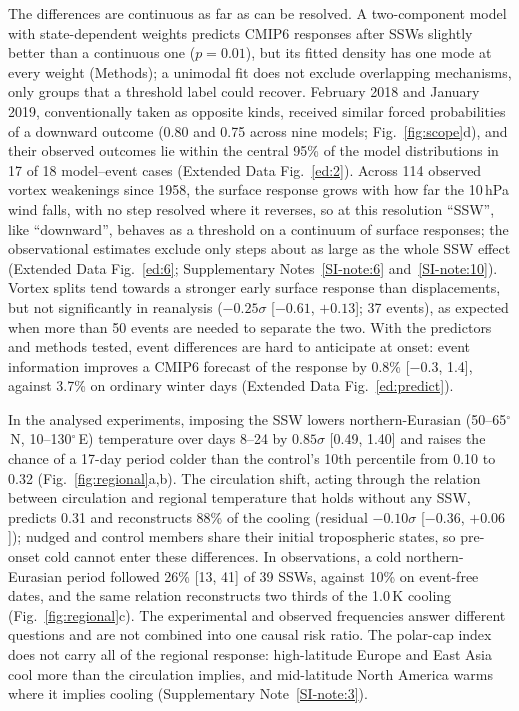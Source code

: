 \documentclass[11pt]{article}
\begin{document}
The differences are continuous as far as can be resolved. A two-component model with state-dependent weights predicts CMIP6 responses after SSWs slightly better than a continuous one ($p = 0.01$), but its fitted density has one mode at every weight (Methods); a unimodal fit does not exclude overlapping mechanisms, only groups that a threshold label could recover. February 2018 and January 2019, conventionally taken as opposite kinds, received similar forced probabilities of a downward outcome (0.80 and 0.75 across nine models; Fig.~\ref{fig:scope}d), and their observed outcomes lie within the central 95\% of the model distributions in 17 of 18 model--event cases (Extended Data Fig.~\ref{ed:2}). Across 114 observed vortex weakenings since 1958, the surface response grows with how far the 10\,hPa wind falls, with no step resolved where it reverses, so at this resolution ``SSW'', like ``downward'', behaves as a threshold on a continuum of surface responses; the observational estimates exclude only steps about as large as the whole SSW effect (Extended Data Fig.~\ref{ed:6}; Supplementary Notes~\ref{SI-note:6} and~\ref{SI-note:10}). Vortex splits tend towards a stronger early surface response than displacements\cite{lehtonen16,nebel24}, but not significantly in reanalysis ($-0.25\sigma$ [$-0.61$, $+0.13$]; 37 events), as expected when more than 50 events are needed to separate the two\cite{maycock15}. With the predictors and methods tested, event differences are hard to anticipate at onset: event information improves a CMIP6 forecast of the response by 0.8\% [$-0.3$, 1.4], against 3.7\% on ordinary winter days (Extended Data Fig.~\ref{ed:predict}).

In the analysed experiments, imposing the SSW lowers northern-Eurasian (50--65$^\circ$\,N, 10--130$^\circ$\,E) temperature over days 8--24 by $0.85\sigma$ [0.49, 1.40] and raises the chance of a 17-day period colder than the control's 10th percentile from 0.10 to 0.32 (Fig.~\ref{fig:regional}a,b). The circulation shift, acting through the relation between circulation and regional temperature that holds without any SSW, predicts 0.31 and reconstructs 88\% of the cooling (residual $-0.10\sigma$ [$-0.36$, $+0.06$]); nudged and control members share their initial tropospheric states, so pre-onset cold\cite{lehtonen16} cannot enter these differences. In observations, a cold northern-Eurasian period followed 26\% [13, 41] of 39 SSWs, against 10\% on event-free dates, and the same relation reconstructs two thirds of the 1.0\,K cooling (Fig.~\ref{fig:regional}c). The experimental and observed frequencies answer different questions and are not combined into one causal risk ratio. The polar-cap index does not carry all of the regional response: high-latitude Europe and East Asia cool more than the circulation implies, and mid-latitude North America warms where it implies cooling (Supplementary Note~\ref{SI-note:3}).
\end{document}
